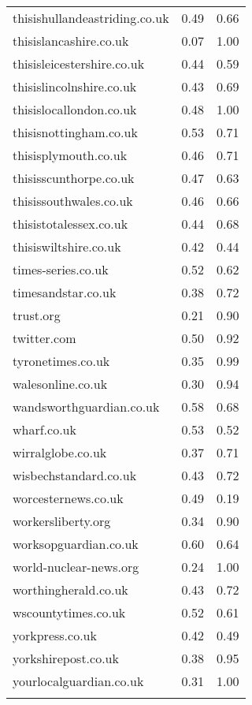 \begin{longtable}{p{}p{}p{}}
  thisishullandeastriding.co.uk & 0.49 & 0.66 \\ 
  thisislancashire.co.uk & 0.07 & 1.00 \\ 
  thisisleicestershire.co.uk & 0.44 & 0.59 \\ 
  thisislincolnshire.co.uk & 0.43 & 0.69 \\ 
  thisislocallondon.co.uk & 0.48 & 1.00 \\ 
  thisisnottingham.co.uk & 0.53 & 0.71 \\ 
  thisisplymouth.co.uk & 0.46 & 0.71 \\ 
  thisisscunthorpe.co.uk & 0.47 & 0.63 \\ 
  thisissouthwales.co.uk & 0.46 & 0.66 \\ 
  thisistotalessex.co.uk & 0.44 & 0.68 \\ 
  thisiswiltshire.co.uk & 0.42 & 0.44 \\ 
  times-series.co.uk & 0.52 & 0.62 \\ 
  timesandstar.co.uk & 0.38 & 0.72 \\ 
  trust.org & 0.21 & 0.90 \\ 
  twitter.com & 0.50 & 0.92 \\ 
  tyronetimes.co.uk & 0.35 & 0.99 \\ 
  walesonline.co.uk & 0.30 & 0.94 \\ 
  wandsworthguardian.co.uk & 0.58 & 0.68 \\ 
  wharf.co.uk & 0.53 & 0.52 \\ 
  wirralglobe.co.uk & 0.37 & 0.71 \\ 
  wisbechstandard.co.uk & 0.43 & 0.72 \\ 
  worcesternews.co.uk & 0.49 & 0.19 \\ 
  workersliberty.org & 0.34 & 0.90 \\ 
  worksopguardian.co.uk & 0.60 & 0.64 \\ 
  world-nuclear-news.org & 0.24 & 1.00 \\ 
  worthingherald.co.uk & 0.43 & 0.72 \\ 
  wscountytimes.co.uk & 0.52 & 0.61 \\ 
  yorkpress.co.uk & 0.42 & 0.49 \\ 
  yorkshirepost.co.uk & 0.38 & 0.95 \\ 
  yourlocalguardian.co.uk & 0.31 & 1.00 \\ 
   \hline
\hline
\label{tab:outlet_not_news}
\end{longtable}
\endgroup
